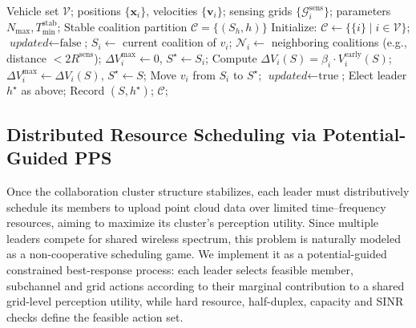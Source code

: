 \documentclass[conference]{IEEEtran}
\begin{document}
\begin{algorithm}[ht]
\caption{Stability-Constrained Cluster Formation and Leader Election}
\label{alg:coalition_formation}
\begin{algorithmic}[1]
\REQUIRE Vehicle set $\mathcal{V}$; positions $\{\mathbf{x}_i\}$, velocities $\{\mathbf{v}_i\}$; sensing grids $\{\mathcal{G}_i^{\mathrm{sens}}\}$; parameters $N_{\max}, T_{\min}^{\mathrm{stab}}$;
\ENSURE Stable coalition partition $\mathcal{C} = \{(S_h, h)\}$
\STATE Initialize: $\mathcal{C} \gets \{ \{i\} \mid i \in \mathcal{V} \}$;
\REPEAT
    \STATE $\textit{updated} \gets \text{false}$;
        \STATE $S_i \gets$ current coalition of $v_i$;
        \STATE $\mathcal{N}_ i \gets$ neighboring coalitions (e.g., distance $<2R^{\mathrm{sens}}$);
        \STATE $\Delta V_i^{\max} \gets 0$, $S^\star \gets S_i$;
                \STATE Compute $\Delta V_i(S) = \beta_i \cdot V_i^{\mathrm{early}}(S)$;
                    \STATE $\Delta V_i^{\max} \gets \Delta V_i(S)$, $S^\star \gets S$;
                \ENDIF
            \ENDIF
        \ENDFOR
            \STATE Move $v_i$ from $S_i$ to $S^\star$;
            \STATE $\textit{updated} \gets \text{true}$;
        \ENDIF
    \ENDFOR
{}
    \STATE Elect leader $h^\star$ as above;
    \STATE Record $(S, h^\star)$;
\ENDFOR
\RETURN $\mathcal{C}$;
\end{algorithmic}
\end{algorithm}

\subsection{Distributed Resource Scheduling via Potential-Guided PPS}

Once the collaboration cluster structure stabilizes, each leader must distributively schedule its members to upload point cloud data over limited time–frequency resources, aiming to maximize its cluster's perception utility. Since multiple leaders compete for shared wireless spectrum, this problem is naturally modeled as a non-cooperative scheduling game. We implement it as a potential-guided constrained best-response process: each leader selects feasible member, subchannel and grid actions according to their marginal contribution to a shared grid-level perception utility, while hard resource, half-duplex, capacity and SINR checks define the feasible action set.
\end{document}
